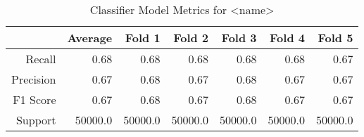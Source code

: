 \begin{table}[h]
    \centering
    \begin{tabular}{r|r|r|r|r|r|r}
        & Average & Fold 1 & Fold 2 & Fold 3 & Fold 4 & Fold 5 \\\hline
        Recall      & 0.68 & 0.68 & 0.68 & 0.68 & 0.68 & 0.67\\
        Precision   & 0.67 & 0.68 & 0.67 & 0.68 & 0.67 & 0.67\\
        F1 Score    & 0.67 & 0.68 & 0.67 & 0.68 & 0.67 & 0.67\\
        Support     & 50000.0 & 50000.0 & 50000.0 & 50000.0 & 50000.0 & 50000.0
\end{tabular}
    \caption{Classifier Model Metrics for <name>}
    \label{tab:model_metrics}
\end{table}